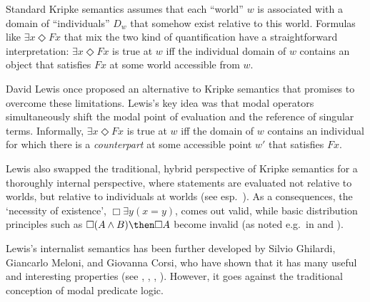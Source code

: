 \documentclass[11pt]{woarticle}
\newcommand{\cmnt}[1]{\iffalse #1 \fi}
\theoremstyle{break}
\theoremstyle{nonumberplain}
\newcommand{\1}{\;\,|\;\,}
\begin{document}
Standard Kripke semantics assumes that each ``world'' $w$ is associated with a
domain of ``individuals'' $D_{w}$ that somehow exist relative to this world.
Formulas like $\exists x \Diamond Fx$ that mix the two kind of quantification
have a straightforward interpretation: $\exists x\Diamond Fx$ is true at $w$ iff
the individual domain of $w$ contains an object that satisfies $Fx$ at some
world accessible from $w$.

\cmnt{%
  
  While conceptually simple, and possibly adequate for certain applications,
  this approach has some limitations. For example, it makes identity and
  distinctness non-contingent. If the domain of $w$ contains two individuals $x$
  and $y$, then there can be no other point from the perspective of which these
  two individuals are identical:
  $\forall x\forall y(x\!\not=\!y \then \Box x\!\not=\!y)$ is valid. For some
  applications, this is not desirable.

  Kripke semantics also has some purely formal limitation. A major strength of
  Kripke semantics in propositional modal logic is that many interesting logics
  are characterised by some class of Kripke frames. This changes when
  quantifiers are added. For example, all systems in between S4.3 and S5 then
  become incomplete (see \cite{ghilardi91incompleteness}).

} %

David Lewis  once proposed an alternative to Kripke semantics that
promises to overcome these limitations. Lewis's key idea was that modal
operators simultaneously shift the modal point of evaluation and the reference
of singular terms. Informally, $\exists x \Diamond Fx$ is true at $w$ iff the
domain of $w$ contains an individual for which there is a \emph{counterpart} at
some accessible point $w'$ that satisfies $Fx$.

Lewis also swapped the traditional, hybrid perspective of Kripke semantics for a
thoroughly internal perspective, where statements are evaluated not relative to
worlds, but relative to individuals at worlds (see esp.\
\cite[230-235]{plurality}). As a consequences, the `necessity of existence',
$\Box \exists y(x\!=\!y)$, comes out valid, while basic distribution principles
such as $\Box (A \land B) \then \Box A$ become invalid (as noted e.g.\ in
\cite{hazen79counterpart} and \cite{woollaston94counterpart}).

Lewis's internalist semantics has been further developed by Silvio Ghilardi,
Giancarlo Meloni, and Giovanna Corsi, who have shown that it has many useful and
interesting properties (see \cite{ghilardi88modal},
\cite{ghilardi91philosophical}, \cite{ghilardi01substitution}
\cite{corsi02counterpart}, \cite[591--616]{brauener07first}). However, it goes
against the traditional conception of modal predicate logic.
\end{document}
